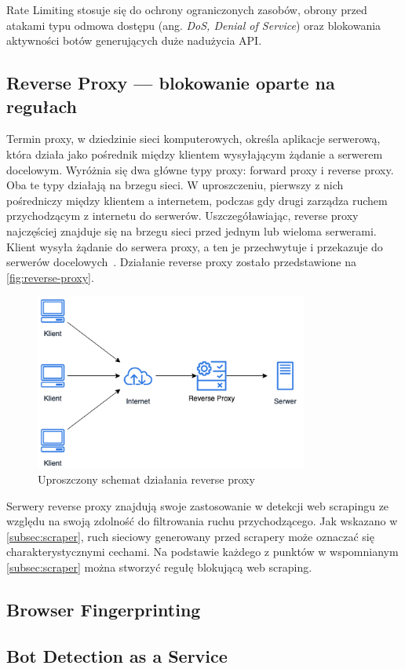Rate Limiting stosuje się do ochrony ograniczonych zasobów, obrony przed atakami typu odmowa dostępu (ang. \emph{DoS, Denial of Service})
oraz blokowania aktywności botów generujących duże nadużycia API\@.

\newpage

\subsection{Reverse Proxy --- blokowanie oparte na regułach}\label{subsec:reverse-proxy}

Termin proxy, w dziedzinie sieci komputerowych, określa aplikacje serwerową, która działa jako pośrednik między klientem wysyłającym żądanie a serwerem docelowym.
Wyróżnia się dwa główne typy proxy: forward proxy i reverse proxy.
Oba te typy działają na brzegu sieci.
W uproszczeniu, pierwszy z nich pośredniczy między klientem a internetem, podczas gdy drugi zarządza ruchem przychodzącym z internetu do serwerów.
Uszczegóławiając, reverse proxy najczęściej znajduje się na brzegu sieci przed jednym lub wieloma serwerami.
Klient wysyła żądanie do serwera proxy, a ten je przechwytuje i przekazuje do serwerów docelowych~\cite{cloudflare-what-is-reverse-proxy}.
Działanie reverse proxy zostało przedstawione na \autoref{fig:reverse-proxy}.

\begin{figure}[H]
    \centering
    \captionsetup{width=.7\linewidth}
    \includegraphics[width=0.8\textwidth]{img/reverse-proxy}
    \caption{Uproszczony schemat działania reverse proxy}
    \label{fig:reverse-proxy}
\end{figure}

Serwery reverse proxy znajdują swoje zastosowanie w detekcji web scrapingu ze względu na swoją zdolność do filtrowania ruchu przychodzącego.
Jak wskazano w \autoref{subsec:scraper}, ruch sieciowy generowany przed scrapery może oznaczać się charakterystycznymi cechami.
Na podstawie każdego z punktów w wspomnianym \autoref{subsec:scraper} można stworzyć regułę blokującą web scraping.

\newpage

\subsection{Browser Fingerprinting}\label{subsec:browser-fingerprinting}


\newpage

\subsection{Bot Detection as a Service}

